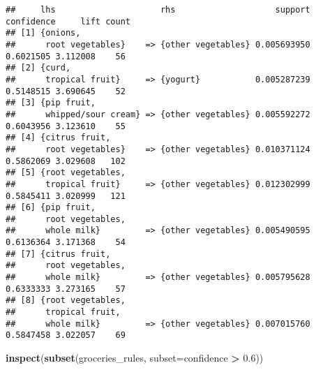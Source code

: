 \documentclass[]{article}
\newenvironment{Shaded}{\begin{snugshade}}{\end{snugshade}}
\newcommand{\KeywordTok}[1]{\textcolor[rgb]{0.13,0.29,0.53}{\textbf{#1}}}
\newcommand{\DataTypeTok}[1]{\textcolor[rgb]{0.13,0.29,0.53}{#1}}
\newcommand{\FloatTok}[1]{\textcolor[rgb]{0.00,0.00,0.81}{#1}}
\newcommand{\StringTok}[1]{\textcolor[rgb]{0.31,0.60,0.02}{#1}}
\newcommand{\OperatorTok}[1]{\textcolor[rgb]{0.81,0.36,0.00}{\textbf{#1}}}
\newcommand{\NormalTok}[1]{#1}
\begin{document}
\begin{verbatim}
##     lhs                     rhs                    support confidence     lift count
## [1] {onions,                                                                        
##      root vegetables}    => {other vegetables} 0.005693950  0.6021505 3.112008    56
## [2] {curd,                                                                          
##      tropical fruit}     => {yogurt}           0.005287239  0.5148515 3.690645    52
## [3] {pip fruit,                                                                     
##      whipped/sour cream} => {other vegetables} 0.005592272  0.6043956 3.123610    55
## [4] {citrus fruit,                                                                  
##      root vegetables}    => {other vegetables} 0.010371124  0.5862069 3.029608   102
## [5] {root vegetables,                                                               
##      tropical fruit}     => {other vegetables} 0.012302999  0.5845411 3.020999   121
## [6] {pip fruit,                                                                     
##      root vegetables,                                                               
##      whole milk}         => {other vegetables} 0.005490595  0.6136364 3.171368    54
## [7] {citrus fruit,                                                                  
##      root vegetables,                                                               
##      whole milk}         => {other vegetables} 0.005795628  0.6333333 3.273165    57
## [8] {root vegetables,                                                               
##      tropical fruit,                                                                
##      whole milk}         => {other vegetables} 0.007015760  0.5847458 3.022057    69
\end{verbatim}

\begin{Shaded}
\begin{Highlighting}[]
\KeywordTok{inspect}\NormalTok{(}\KeywordTok{subset}\NormalTok{(groceries_rules, }\DataTypeTok{subset=}\NormalTok{confidence }\OperatorTok{>}\StringTok{ }\FloatTok{0.6}\NormalTok{))}
\end{Highlighting}
\end{Shaded}
\end{document}
